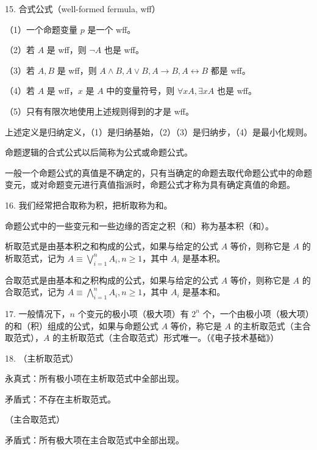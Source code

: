 \documentclass[normal,cyan]{elegantnote}
\begin{document}
15. 合式公式（well-formed fermula, wff）

（1）一个命题变量 $p$ 是一个 wff。

（2）若 $A$ 是 wff，则 $\neg A$ 也是 wff。

（3）若 $A,B$ 是 wff，则 $A\wedge B,A\vee B,A\rightarrow B,A\leftrightarrow B$ 都是 wff。

（4）若 $A$ 是 wff，$x$ 是 $A$ 中的变量符号，则 $\forall xA,\exists xA$ 也是 wff。

（5）只有有限次地使用上述规则得到的才是 wff。

上述定义是归纳定义，（1）是归纳基始，（2）（3）是归纳步，（4）是最小化规则。

命题逻辑的合式公式以后简称为公式或命题公式。

一般一个命题公式的真值是不确定的，只有当确定的命题去取代命题公式中的命题变元，或对命题变元进行真值指派时，命题公式才称为具有确定真值的命题。

16. 我们经常把合取称为积，把析取称为和。

命题公式中的一些变元和一些边缘的否定之积（和）称为基本积（和）。

析取范式是由基本积之和构成的公式，如果与给定的公式 $A$ 等价，则称它是 $A$ 的析取范式，记为 $A\equiv\bigvee\limits_{i=1}^{n}A_i,n\ge1$，其中 $A_i$ 是基本积。

合取范式是由基本和之积构成的公式，如果与给定的公式 $A$ 等价，则称它是 $A$ 的合取范式，记为 $A\equiv\bigwedge\limits_{i=1}^{n}A_i,n\ge1$，其中 $A_i$ 是基本和。

17. 一般情况下，$n$ 个变元的极小项（极大项）有 $2^n$ 个，一个由极小项（极大项）的和（积）组成的公式，如果与命题公式 $A$ 等价，称它是 $A$ 的主析取范式（主合取范式），$A$ 的主析取范式（主合取范式）形式唯一。（《电子技术基础》）

18. （主析取范式）

永真式：所有极小项在主析取范式中全部出现。

矛盾式：不存在主析取范式。

（主合取范式）

矛盾式：所有极大项在主合取范式中全部出现。
\end{document}
